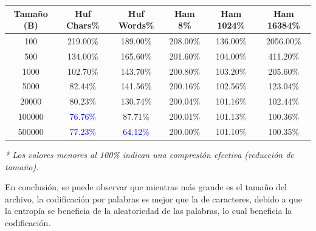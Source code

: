 \begin{table}[h]
\centering
\begin{tabular}{|c|c|c|c|c|c|}
\hline
\textbf{Tamaño (B)} & \textbf{Huf Chars\%} & \textbf{Huf Words\%} & \textbf{Ham 8\%} & \textbf{Ham 1024\%} & \textbf{Ham 16384\%} \\ \hline
100                 & 219.00\%             & 189.00\%             & 208.00\%         & 136.00\%          & 2056.00\%            \\ \hline
500                 & 134.00\%             & 165.60\%             & 201.60\%         & 104.00\%          & 411.20\%             \\ \hline
1000                & 102.70\%             & 143.70\%             & 200.80\%         & 103.20\%          & 205.60\%             \\ \hline
5000                & 82.44\%              & 141.56\%             & 200.16\%         & 102.56\%          & 123.04\%             \\ \hline
20000               & 80.23\%              & 130.74\%             & 200.04\%         & 101.16\%          & 102.44\%             \\ \hline
100000              & \textcolor{blue}{76.76\%} & 87.71\%              & 200.01\%         & 101.13\%          & 100.36\%             \\ \hline
500000              & \textcolor{blue}{77.23\%} & \textcolor{blue}{64.12\%} & 200.00\%         & 101.10\%          & 100.35\%             \\ \hline
\end{tabular}

\vspace{0.2cm}
\small{\textit{* Los valores menores al 100\% indican una compresión efectiva (reducción de tamaño).}}
\end{table}

En conclusión, se puede observar que mientras más grande es el tamaño del archivo, la codificación por palabras es mejor que la de caracteres, debido a que la entropía se beneficia de la aleatoriedad de las palabras, lo cual beneficia la codificación.